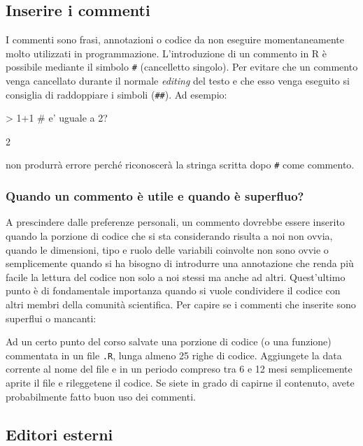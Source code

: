 \documentclass[onecolumn,11pt]{book}
\begin{document}
\subsection*{Inserire i commenti}  
I commenti sono frasi, annotazioni o codice da non eseguire momentaneamente molto utilizzati in programmazione. L'introduzione di un commento in \textsf{R} \`e possibile mediante il simbolo \texttt{\#} (cancelletto singolo). Per evitare che un commento venga cancellato durante il normale \textit{editing} del testo e che esso venga eseguito si consiglia di raddoppiare i simboli (\texttt{\#\#}). Ad esempio:
\index{\texttt{\#}} 
\begin{Schunk}
\begin{Sinput}
> 1+1 # e' uguale a 2?
\end{Sinput}
\begin{Soutput}
[1] 2
\end{Soutput}
\end{Schunk}
non produrr\`a errore perch\'e riconoscer\`a la stringa scritta dopo \texttt{\#} come commento.

\subsubsection{Quando un commento \`e utile e quando \`e superfluo?}
A prescindere dalle preferenze personali, un commento dovrebbe essere inserito quando la porzione di codice che si sta considerando risulta a noi non ovvia, quando le dimensioni, tipo e ruolo delle variabili coinvolte non sono ovvie o semplicemente quando si ha bisogno di introdurre una annotazione che renda pi\`u facile la lettura del codice non solo a noi stessi ma anche ad altri. Quest'ultimo punto \`e di fondamentale importanza quando si vuole condividere il codice con altri membri della comunit\`a scientifica. Per capire se i commenti che inserite sono superflui o mancanti:
\begin{shaded}
Ad un certo punto del corso salvate una porzione di codice (o una funzione) commentata in un file \texttt{.R}, lunga almeno 25 righe di codice. Aggiungete la data corrente al nome del file e in un periodo compreso tra 6 e 12 mesi semplicemente aprite il file e rileggetene il codice. Se siete in grado di capirne il contenuto, avete probabilmente fatto buon uso dei commenti.
 \end{shaded} 

\subsection*{Editori esterni}
\end{document}

